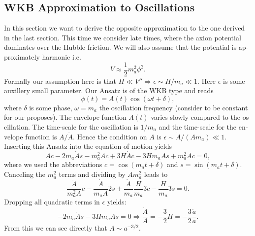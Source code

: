 \documentclass[master,       %
               twoside,        %
               BCOR10mm,       %
               english,ngerman, %
               ]{GAUBM}
\begin{document}
\begin{otherlanguage}{english}
\subsection{WKB Approximation to Oscillations}
\label{sec:wkb_approximation}

In this section we want to derive the opposite approximation to the one derived in the last section.
This time we consider late times, where the axion potential dominates over the Hubble friction.
We will also assume that the potential is approximately harmonic i.e.
\begin{equation}
	V \approx \frac{1}{2} m_a^2 \phi^2.
\end{equation}
Formally our assumption here is that $H \ll V'' \Rightarrow \epsilon \sim H / m_a \ll 1$. Here $\epsilon$ is some auxillery small parameter.
Our Ansatz is of the WKB type and reads
\begin{equation}
	\phi(t) = A(t) \cos(\omega t + \delta),
\end{equation}
where $\delta$ is some phase, $\omega = m_a$ the oscillation frequency (consider to be constant for our proposes). The envelope function $A(t)$ varies slowly compared to the oscillation. The time-scale for the oscillation is $1/m_a$ and the time-scale for the envelope function is $A / \dot{A}$. Hence the condition on $A$ is $\epsilon \sim \dot{A} / (A m_a) \ll 1$.
Inserting this Ansatz into the equation of motion yields
\begin{equation}
	\ddot{A} c - 2 m_a \dot{A} s - m_a^2 A c + 3 H \dot{A} c - 3 H m_a A s + m_a^2 A c = 0,
\end{equation}
where we used the abbreviations $c = \cos(m_a t + \delta)$ and $s = \sin(m_a t + \delta)$.
Canceling the $m_a^2$ terms and dividing by $A m_a^2$ leads to
\begin{equation}
	\frac{\ddot{A}}{m_a^2 A} c - \frac{\dot{A}}{m_a A} 2 s + \frac{\dot{A}}{m_a} \frac{H}{m_a} 3 c - \frac{H}{m_a} 3 s = 0.
\end{equation}
Dropping all quadratic terms in $\epsilon$ yields:
\begin{equation}
	 - 2 m_a \dot{A} s - 3 H m_a A s = 0 \Rightarrow \frac{\dot{A}}{A} = - \frac{3}{2} H = - \frac{3}{2} \frac{\dot{a}}{a}.
\end{equation}
From this we can see directly that $A \sim a^{-3/2}$.


\end{otherlanguage}
\end{document}
